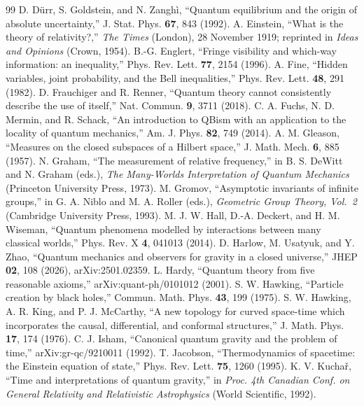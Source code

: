 \documentclass[11pt]{article}
\theoremstyle{definition}
\theoremstyle{remark}
\begin{document}
\begin{thebibliography}{99}
 D. D\"urr, S. Goldstein, and N. Zangh\`i, ``Quantum equilibrium and the origin of absolute uncertainty,'' J. Stat. Phys. \textbf{67}, 843 (1992).
 A. Einstein, ``What is the theory of relativity?,'' \emph{The Times} (London), 28 November 1919; reprinted in \emph{Ideas and Opinions} (Crown, 1954).
 B.-G. Englert, ``Fringe visibility and which-way information: an inequality,'' Phys. Rev. Lett. \textbf{77}, 2154 (1996).
 A. Fine, ``Hidden variables, joint probability, and the Bell inequalities,'' Phys. Rev. Lett. \textbf{48}, 291 (1982).
 D. Frauchiger and R. Renner, ``Quantum theory cannot consistently describe the use of itself,'' Nat. Commun. \textbf{9}, 3711 (2018).
 C. A. Fuchs, N. D. Mermin, and R. Schack, ``An introduction to QBism with an application to the locality of quantum mechanics,'' Am. J. Phys. \textbf{82}, 749 (2014).
 A. M. Gleason, ``Measures on the closed subspaces of a Hilbert space,'' J. Math. Mech. \textbf{6}, 885 (1957).
 N. Graham, ``The measurement of relative frequency,'' in B. S. DeWitt and N. Graham (eds.), \emph{The Many-Worlds Interpretation of Quantum Mechanics} (Princeton University Press, 1973).
 M. Gromov, ``Asymptotic invariants of infinite groups,'' in G. A. Niblo and M. A. Roller (eds.), \emph{Geometric Group Theory, Vol.~2} (Cambridge University Press, 1993).
 M. J. W. Hall, D.-A. Deckert, and H. M. Wiseman, ``Quantum phenomena modelled by interactions between many classical worlds,'' Phys. Rev. X \textbf{4}, 041013 (2014).
 D. Harlow, M. Usatyuk, and Y. Zhao, ``Quantum mechanics and observers for gravity in a closed universe,'' JHEP \textbf{02}, 108 (2026), arXiv:2501.02359.
 L. Hardy, ``Quantum theory from five reasonable axioms,'' arXiv:quant-ph/0101012 (2001).
 S. W. Hawking, ``Particle creation by black holes,'' Commun. Math. Phys. \textbf{43}, 199 (1975).
 S. W. Hawking, A. R. King, and P. J. McCarthy, ``A new topology for curved space-time which incorporates the causal, differential, and conformal structures,'' J. Math. Phys. \textbf{17}, 174 (1976).
 C. J. Isham, ``Canonical quantum gravity and the problem of time,'' arXiv:gr-qc/9210011 (1992).
 T. Jacobson, ``Thermodynamics of spacetime: the Einstein equation of state,'' Phys. Rev. Lett. \textbf{75}, 1260 (1995).
 K. V. Kucha\v{r}, ``Time and interpretations of quantum gravity,'' in \emph{Proc. 4th Canadian Conf. on General Relativity and Relativistic Astrophysics} (World Scientific, 1992).

\end{thebibliography}
\end{document}
